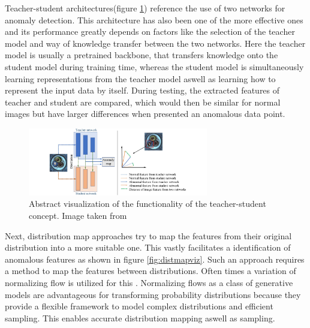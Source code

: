 Teacher-student architectures(figure \ref{fig:TSviz}) reference the use of two networks for anomaly detection. 
This architecture has also been one of the more effective ones and its performance greatly depends on factors like the selection of the teacher model and way 
of knowledge transfer between the two networks. Here the teacher model is usually a pretrained 
backbone, that transfers knowledge onto the student model during training time, whereas the student model is simultaneously learning representations from the teacher model aswell as learning 
how to represent the input data by itself. During testing, the extracted features of teacher and student are compared, which would then be similar for normal images but have larger differences 
when presented an anomalous data point.\newline


\begin{figure}[H]
    \centering
    \includegraphics[width=0.7\textwidth]{figures/approachvizgeneral/TSviz.jpg}
    \caption{Abstract visualization of the functionality of the teacher-student concept. Image taken from \cite{liu2024deep}}
    \label{fig:TSviz}
\end{figure}



Next, distribution map approaches try to map the features from their original distribution into a more suitable one. This vastly facilitates a identification of anomalous features as shown in 
figure \ref{fig:distmapviz}. Such an approach requires a method to map the features between distributions. Often times a variation of normalizing flow is utilized for this \cite{liu2024deep}. 
Normalizing flows as a class of generative models \cite{Kobyzev_2021normalizingflowexplanation} are advantageous for transforming probability distributions because they provide a flexible 
framework to model complex distributions and efficient sampling. This enables accurate distribution mapping aswell as sampling. \newline


